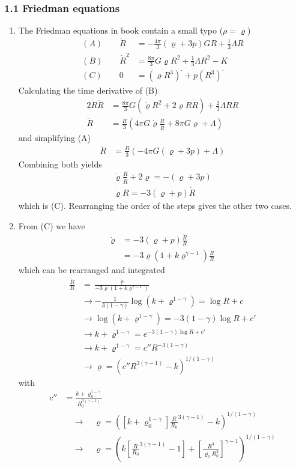 \documentclass[10pt,a4paper]{article}
\theoremstyle{definition}
\begin{document}
\subsubsection{1.1 Friedman equations}
\begin{enumerate}
\item The Friedman equations in book contain a small typo ($\rho=\varrho$)
\begin{align}
    (A)\qquad \ddot R&=-\frac{4\pi}{3}(\varrho+3p)GR+\frac{1}{3}\Lambda R\\
    (B)\qquad  \dot R^2&=\frac{8\pi}{3}G\varrho R^2+\frac{1}{3}\Lambda R^2-K\\
    (C)\qquad 0&=(\varrho R^3)^\cdot+p(R^3)^\cdot
\end{align}
Calculating the time derivative of (B)
\begin{align}
    2\dot{R}\ddot{R}&=\frac{8\pi}{3}G(\dot{\varrho}R^2+2\varrho R\dot{R})+\frac{2}{3}\Lambda R\dot{R}\\
    \ddot{R}&=\frac{R}{3}\left(4\pi G\dot\varrho \frac{R}{\dot{R}}+8\pi G\varrho +\Lambda\right)
\end{align}
and simplifying (A)
\begin{align}
    \ddot R&=\frac{R}{3}\left(-4\pi G(\varrho+3p)+\Lambda\right)
\end{align}
Combining both yields
\begin{align}
    \dot\varrho \frac{R}{\dot{R}}+2\varrho=-(\varrho+3p)\\
    \dot\varrho R=-3(\varrho+p)\dot{R}
\end{align}
which is (C). Rearranging the order of the steps gives the other two  cases.
\item From (C) we have
\begin{align}
    \dot\varrho &=-3(\varrho+p)\frac{\dot{R}}{R}\\
    &=-3\varrho\left(1+k\varrho^{\gamma-1}\right)\frac{\dot{R}}{R}
\end{align}
which can be rearranged and integrated
\begin{align}
    \frac{\dot{R}}{R}&=\frac{\dot\varrho}{-3\varrho\left(1+k\varrho^{\gamma-1}\right)}\\
    &\rightarrow-\frac{1}{3(1-\gamma)}\log(k+\varrho^{1-\gamma})=\log R+c\\
    &\rightarrow\log(k+\varrho^{1-\gamma})=-3(1-\gamma)\log R+c'\\
    &\rightarrow k+\varrho^{1-\gamma}=e^{-3(1-\gamma)\log R+c'}\\
    &\rightarrow k+\varrho^{1-\gamma}=c''R^{-3(1-\gamma)}\\
    &\rightarrow \varrho=\left(c''R^{3(\gamma-1)}-k\right)^{1/(1-\gamma)}
\end{align}
with
\begin{align}
    c''&=\frac{k+\varrho_0^{1-\gamma}}{R_0^{3(\gamma-1)}}\\
    &\quad\rightarrow\quad\varrho=\left([k+\varrho_0^{1-\gamma}]\frac{R}{R_0}^{3(\gamma-1)}-k\right)^{1/(1-\gamma)}\\
    &\quad\rightarrow\quad\varrho=\left(k\left[\frac{R}{R_0}^{3(\gamma-1)}-1\right]+\left[\frac{R^3}{\varrho_0R_0^3}\right]^{\gamma-1}\right)^{1/(1-\gamma)}
\end{align}


\end{enumerate}
\end{document}
